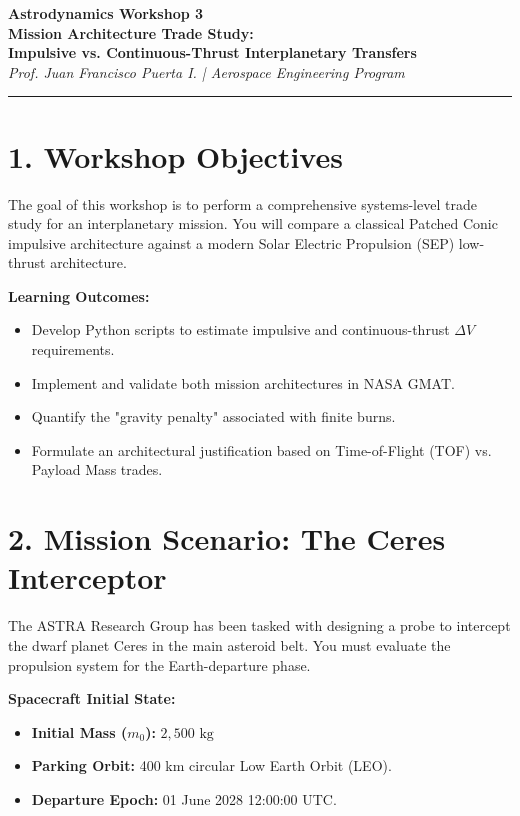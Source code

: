 \documentclass[11pt, letterpaper]{article}
\begin{document}
\begin{center}
    {\Large \textbf{Astrodynamics Workshop 3}} \\
    \vspace{0.2cm}
    {\huge \textbf{Mission Architecture Trade Study:}} \\
    {\LARGE \textbf{Impulsive vs. Continuous-Thrust Interplanetary Transfers}} \\
    \vspace{0.4cm}
    \textit{Prof. Juan Francisco Puerta I. | Aerospace Engineering Program}
\end{center}

\hrule
\vspace{0.5cm}

\section*{1. Workshop Objectives}
The goal of this workshop is to perform a comprehensive systems-level trade study for an interplanetary mission. You will compare a classical Patched Conic impulsive architecture against a modern Solar Electric Propulsion (SEP) low-thrust architecture. 

\textbf{Learning Outcomes:}
\begin{itemize}
    \item Develop Python scripts to estimate impulsive and continuous-thrust $\Delta V$ requirements.
    \item Implement and validate both mission architectures in NASA GMAT.
    \item Quantify the "gravity penalty" associated with finite burns.
    \item Formulate an architectural justification based on Time-of-Flight (TOF) vs. Payload Mass trades.
\end{itemize}

\section*{2. Mission Scenario: The Ceres Interceptor}
The ASTRA Research Group has been tasked with designing a probe to intercept the dwarf planet Ceres in the main asteroid belt. You must evaluate the propulsion system for the Earth-departure phase.

\textbf{Spacecraft Initial State:}
\begin{itemize}
    \item \textbf{Initial Mass ($m_0$):} $2,500 \text{ kg}$
    \item \textbf{Parking Orbit:} 400 km circular Low Earth Orbit (LEO).
    \item \textbf{Departure Epoch:} 01 June 2028 12:00:00 UTC.
\end{itemize}
\end{document}
